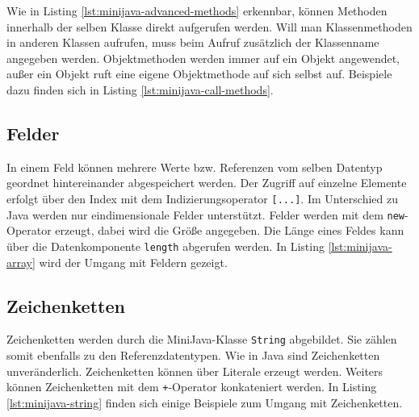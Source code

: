 

Wie in Listing \ref{lst:minijava-advanced-methods} erkennbar, können Methoden innerhalb der selben Klasse direkt aufgerufen werden. Will man Klassenmethoden in anderen Klassen aufrufen, muss beim Aufruf zusätzlich der Klassenname angegeben werden. Objektmethoden werden immer auf ein Objekt angewendet, außer ein Objekt ruft eine eigene Objektmethode auf sich selbst auf. Beispiele dazu finden sich in Listing \ref{lst:minijava-call-methods}.



\subsection{Felder}
\label{subsec:MiniJava-Felder}

In einem Feld können mehrere Werte bzw. Referenzen vom selben Datentyp geordnet hintereinander abgespeichert werden. Der Zugriff auf einzelne Elemente erfolgt über den Index mit dem Indizierungsoperator \lstinline{[...]}. Im Unterschied zu Java werden nur eindimensionale Felder unterstützt. Felder werden mit dem \lstinline{new}-Operator erzeugt, dabei wird die Größe angegeben. Die Länge eines Feldes kann über die Datenkomponente \lstinline{length} abgerufen werden. In Listing \ref{lst:minijava-array} wird der Umgang mit Feldern gezeigt.



\subsection{Zeichenketten}
\label{subsec:MiniJava-Zeichenketten}

Zeichenketten werden durch die MiniJava-Klasse \lstinline{String} abgebildet. Sie zählen somit ebenfalls zu den Referenzdatentypen. Wie in Java sind Zeichenketten unveränderlich. Zeichenketten können über Literale erzeugt werden. Weiters können Zeichenketten mit dem \lstinline{+}-Operator konkateniert werden. In Listing \ref{lst:minijava-string} finden sich einige Beispiele zum Umgang mit Zeichenketten.



